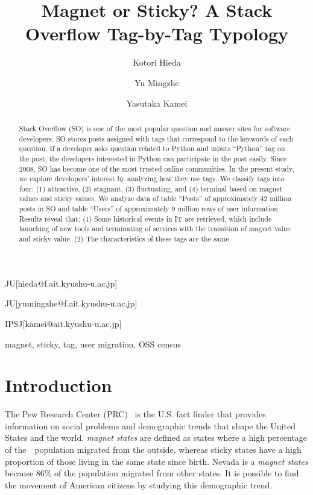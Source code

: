 \documentclass[english,preprint,JIP,technote]{ipsj}
\begin{document}
\title{Magnet or Sticky? A Stack Overflow Tag-by-Tag Typology\\}


\author{Kotori Hieda}{JU}[hieda@f.ait.kyushu-u.ac.jp]
\author{Yu Mingzhe}{JU}[yumingzhe@f.ait.kyushu-u.ac.jp]
\author{Yasutaka Kamei}{IPSJ}[kamei@ait.kyushu-u.ac.jp]


\begin{abstract}
Stack Overflow (SO) is one of the most popular question and answer sites for software developers. SO stores posts assigned with tags that correspond to the keywords of each question. If a developer asks question related to Python and inputs ``Python'' tag on the post, the developers interested in Python can participate in the post easily. Since 2008, SO has become one of the most trusted online communities. In the present study, we explore developers' interest by analyzing how they use tags. We classify tags into four: (1) attractive, (2) stagnant, (3) fluctuating, and (4) terminal based on magnet values and sticky values. We analyze data of table ``Posts'' of approximately 42 million posts in SO and table ``Users'' of approximately 9 million rows of user information. Results reveal that: 
(1) Some historical events in IT are retrieved, which include launching of new tools and terminating of services with the transition of magnet value and sticky value.
(2) The characteristics of these tags are the same.
\end{abstract}



\begin{keyword}
magnet, sticky, tag, user migration, OSS census
\end{keyword}


\maketitle

\section{Introduction}
The Pew Research Center (PRC)~\cite{communityeconomic} is the U.S. fact finder that provides information on social problems and demographic trends that shape the United States and the world. \emph{magnet states} are defined as states where a high percentage of the　population migrated from the outside, whereas sticky states have a high proportion of those living in the same state since birth. Nevada is a \emph{magnet states} because  86\% of the population migrated from other states. It is possible to find the movement of American citizens by studying this demographic trend.
\end{document}
